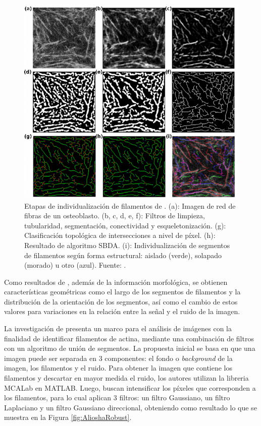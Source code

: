 \begin{figure}[h!]
        \includegraphics[scale=0.75]{imagenes/QuantitativeIFS.png}
        \caption{Etapas de individualizaci\'on de filamentos de \cite{qiu2014quantitative}. (a): Imagen de red de fibras de un osteoblasto. (b, c, d, e, f): Filtros de limpieza, tubularidad, segmentaci\'on, conectividad y esqueletonizaci\'on. (g): Clasificaci\'on topol\'ogica de intersecciones a nivel de p\'ixel. (h): Resultado de algoritmo SBDA. (i): Individualizaci\'on de segmentos de filamentos seg\'un forma estructural: aislado (verde), solapado (morado) u otro (azul). Fuente: \cite{qiu2014quantitative}.}
        \label{fig:IFS}
\end{figure}

Como resultados de \cite{qiu2014quantitative}, adem\'as de la informaci\'on morfol\'ogica, se obtienen caracter\'isticas geom\'etricas como el largo de los segmentos de  filamentos y la distribuci\'on de la orientaci\'on de los segmentos, as\'i como el cambio de estos valores para variaciones en la relaci\'on entre la se\~nal y el ruido de la imagen.


\smallskip
La investigaci\'on de \cite{alioscha2016robust} presenta un marco para el an\'alisis de im\'agenes con la finalidad de identificar filamentos de actina, mediante una combinaci\'on de filtros con un algoritmo de uni\'on de segmentos. La propuesta inicial se basa en que una imagen puede ser separada en 3 componentes: el fondo o {\it background} de la imagen, los filamentos y el ruido. Para obtener la imagen que contiene los filamentos y descartar en mayor medida el ruido, los autores utilizan la libreria MCALab en MATLAB. Luego, buscan intensificar los p\'ixeles que corresponden a los filamentos, para lo cual aplican 3 filtros: un filtro Gaussiano, un filtro Laplaciano y un filtro Gaussiano direccional, obteniendo como resultado lo que se muestra en la Figura \ref{fig:AlioshaRobust}.

